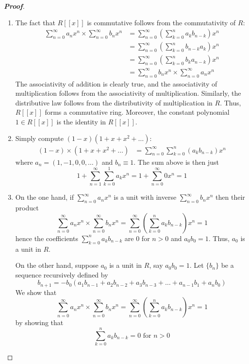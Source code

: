 \documentclass[12pt,leqno]{book}
\theoremstyle{definition}
\newenvironment{Proof}{\begin{proof}[\textnormal{\textbf{Proof}}]}{\end{proof}}
\begin{document}
\begin{enumerate}
\begin{Proof}
 \begin{enumerate}
  \item The fact that $R[[x]]$ is commutative follows from the commutativity of $R$: \begin{align*}\sum_{n=0}^{\infty}a_nx^n\times\sum_{n=0}^{\infty}b_nx^n&=\sum_{n=0}^{\infty}\left(\sum_{k=0}^na_kb_{n-k}\right)x^n\\&=\sum_{n=0}^{\infty}\left(\sum_{k=0}^nb_{n-k}a_k\right)x^n\\&=\sum_{n=0}^{\infty}\left(\sum_{k=0}^nb_ka_{n-k}\right)x^n\\&=\sum_{n=0}^{\infty}b_nx^n\times\sum_{n=0}^{\infty}a_nx^n\end{align*} The associativity of addition is clearly true, and the associativity of multiplication follows from the associativity of multiplication. Similarly, the distributive law follows from the distributivity of multiplication in $R$. Thus, $R[[x]]$ forms a commutative ring. Moreover, the constant polynomial $1\in R[[x]]$ is the identity in $R[[x]]$.
  \item Simply compute $(1-x)(1+x+x^2+\hdots)$:\begin{align*}(1-x)\times(1+x+x^2+\hdots)&=\sum_{n=0}^{\infty}\sum_{k=0}^n\left(a_kb_{n-k}\right)x^n\end{align*} where $a_n=(1,-1,0,0,\hdots)$ and $b_n\equiv1$. The sum above is then just \[1+\sum_{n=1}^{\infty}\sum_{k=0}^1a_kx^n=1+\sum_{n=0}^{\infty}0x^n=1\]
  \item On the one hand, if $\displaystyle\sum_{n=0}^{\infty}a_nx^n$ is a unit with inverse $\displaystyle\sum_{n=0}^{\infty}b_nx^n$ then their product \[\sum_{n=0}^{\infty}a_nx^n\times\sum_{n=0}^{\infty}b_nx^n=\sum_{n=0}^{\infty}\left(\sum_{k=0}^na_kb_{n-k}\right)x^n=1\] hence the coefficients $\displaystyle\sum_{k=0}^na_kb_{n-k}$ are 0 for $n>0$ and $a_0b_0=1$. Thus, $a_0$ is a unit in $R$.

On the other hand, suppose $a_0$ is a unit in $R$, say $a_0b_0=1$. Let $\{b_n\}$ be a sequence recursively defined by \[b_{n+1}=-b_0(a_1b_{n-1}+a_2b_{n-2}+a_3b_{n-3}+\hdots+a_{n-1}b_1+a_nb_0)\] We show that \[\sum_{n=0}^{\infty}a_nx^n\times\sum_{n=0}^{\infty}b_nx^n=\sum_{n=0}^{\infty}\left(\sum_{k=0}^na_kb_{n-k}\right)x^n=1\] by showing that \[\sum_{k=0}^na_kb_{n-k}=0\text{ for }n>0\] 
 \end{enumerate}

\end{Proof}

\end{enumerate}
\end{document}
